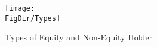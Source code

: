 \begin{figure}[ht!]
	\centering
    \texttt{[image: \\FigDir/Types]}
    \caption{Types of Equity and Non-Equity Holder} \label{fig:Timeline}
\end{figure}
